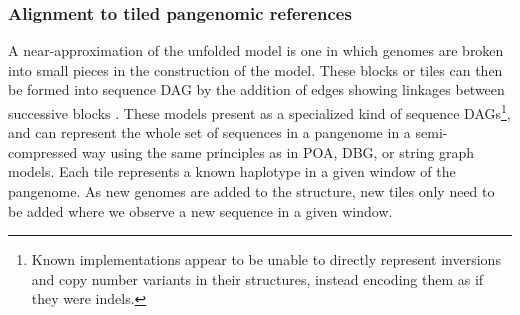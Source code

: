 \documentclass[a4paper,12pt,numbered,oneside]{Classes/PhDThesisPSnPDF}
\begin{document}


\subsubsection{Alignment to tiled pangenomic references}

A near-approximation of the unfolded model is one in which genomes are broken into small pieces in the construction of the model.
These blocks or tiles can then be formed into sequence DAG by the addition of edges showing linkages between successive blocks \cite{guthrie2015tiling}.
These models present as a specialized kind of sequence DAGs\footnote{Known implementations appear to be unable to directly represent inversions and copy number variants in their structures, instead encoding them as if they were indels.}, and can represent the whole set of sequences in a pangenome in a semi-compressed way using the same principles as in POA, DBG, or string graph models.
Each tile represents a known haplotype in a given window of the pangenome.
As new genomes are added to the structure, new tiles only need to be added where we observe a new sequence in a given window.
\end{document}
